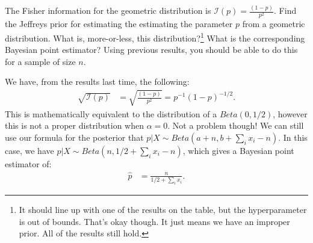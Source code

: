
The Fisher information for the geometric distribution is $\mathcal{I}(p) = \frac{(1-p)}{p^2}$.
Find the Jeffreys prior for estimating the estimating the parameter $p$ from
a geometric distribution. What is, more-or-less, this distribution?\footnote{
  It should line up with one of the results on the table, but the hyperparameter
  is out of bounds. That's okay though. It just means we have an improper prior.
  All of the results still hold. 
} What is the corresponding Bayesian point estimator? Using previous results,
you should be able to do this for a sample of size $n$.


We have, from the results last time, the following:
\begin{align*}
\sqrt{\mathcal{I}(p)} &= \sqrt{\frac{(1-p)}{p^2}} = p^{-1} (1 - p)^{-1/2}.
\end{align*}
This is mathematically equivalent to the distribution of a $Beta(0, 1/2)$,
however this is not a proper distribution when $\alpha = 0$. Not a problem
though! We can still use our formula for the posterior that 
$p | X \sim Beta(a + n, b + \sum_i x_i - n)$. In this case, we have
$p | X \sim Beta(n, 1/2 + \sum_i x_i - n)$, which gives a Bayesian point
estimator of:
\begin{align*}
\widehat{p} &= \frac{n}{1/2 + \sum_i x_i}.
\end{align*}
